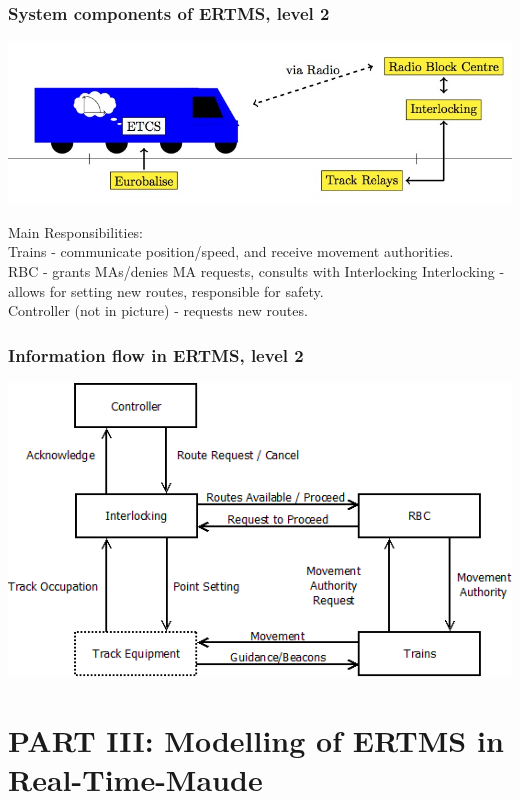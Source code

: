 \documentclass{beamer}
\begin{document}
\begin{frame}
\frametitle{System components of ERTMS, level 2}
\includegraphics[scale =0.8]{ETCSlevel2}

\bigskip

Main Responsibilities:\\

Trains - communicate position/speed, and receive movement authorities.\\
RBC - grants MAs/denies MA requests, consults with Interlocking
   Interlocking  - allows for setting new routes, responsible for safety.\\  \pause
Controller (not in picture) - requests new routes.


\end{frame}



\begin{frame}
\frametitle{Information flow in ERTMS, level 2}
\begin{center}
\includegraphics[scale=0.5]{architecture.png}
\end{center}
\end{frame}






\section{PART III: Modelling of  ERTMS in Real-Time-Maude}
\end{document}
